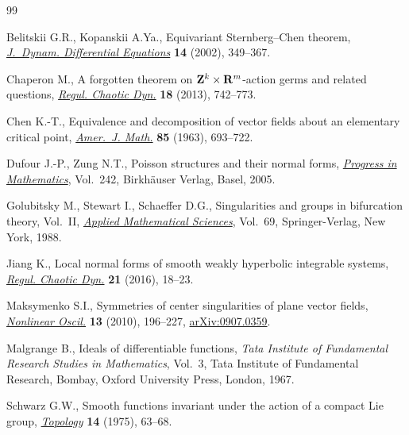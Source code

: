 \documentclass[pdftex]{sigma}
\numberwithin{equation}{section}
\begin{document}
\begin{thebibliography}{99}
\footnotesize\itemsep=0pt

Belitskii G.R., Kopanskii A.Ya., Equivariant {S}ternberg--{C}hen theorem,
 \href{https://doi.org/10.1023/A:1015178720344}{\textit{J.~Dynam. Differential Equations}} \textbf{14} (2002), 349--367.

Chaperon M., A forgotten theorem on {${\bf Z}^k\times{\bf R}^m$}-action germs
 and related questions, \href{https://doi.org/10.1134/S1560354713060130}{\textit{Regul. Chaotic Dyn.}} \textbf{18} (2013),
 742--773.

Chen K.-T., Equivalence and decomposition of vector f\/ields about an elementary
 critical point, \href{https://doi.org/10.2307/2373115}{\textit{Amer.~J. Math.}} \textbf{85} (1963), 693--722.

Dufour J.-P., Zung N.T., Poisson structures and their normal forms,
 \href{https://doi.org/10.1007/b137493}{\textit{Progress in Mathematics}}, Vol.~242, Birkh\"auser Verlag, Basel, 2005.

Golubitsky M., Stewart I., Schaef\/fer D.G., Singularities and groups in
 bifurcation theory, {V}ol.~{II}, \href{https://doi.org/10.1007/978-1-4612-4574-2}{\textit{Applied Mathematical Sciences}},
 Vol.~69, Springer-Verlag, New York, 1988.

Jiang K., Local normal forms of smooth weakly hyperbolic integrable systems,
 \href{https://doi.org/10.1134/S1560354716010020}{\textit{Regul. Chaotic Dyn.}} \textbf{21} (2016), 18--23.

Maksymenko S.I., Symmetries of center singularities of plane vector f\/ields,
 \href{https://doi.org/10.1007/s11072-010-0110-4}{\textit{Nonlinear Oscil.}} \textbf{13} (2010), 196--227, \href{https://arxiv.org/abs/0907.0359}{arXiv:0907.0359}.

Malgrange B., Ideals of dif\/ferentiable functions, \textit{Tata Institute of
 Fundamental Research Studies in Mathematics}, Vol.~3, Tata Institute of
 Fundamental Research, Bombay, Oxford University Press, London, 1967.

Schwarz G.W., Smooth functions invariant under the action of a compact {L}ie
 group, \href{https://doi.org/10.1016/0040-9383(75)90036-1}{\textit{Topology}} \textbf{14} (1975), 63--68.


\end{thebibliography}
\end{document}

